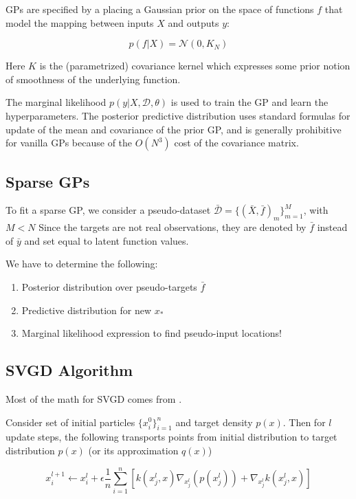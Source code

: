 \documentclass[12pt]{article}
\renewcommand{\[}{\left[}
\renewcommand{\]}{\right]}
\renewcommand{\(}{\left(}
\renewcommand{\)}{\right)}
\begin{document}
GPs are specified by a placing a Gaussian prior on the space of functions $f$ that model the mapping between inputs $X$ and outputs $y$:

$$p(f | X) = \mathcal{N}(0, K_N)$$

Here $K$ is the (parametrized) covariance kernel which expresses some prior notion of smoothness of the underlying function.

The marginal likelihood $p(y | X, \mathcal{D}, \theta)$ is used to train the GP and learn the hyperparameters. The posterior predictive distribution uses standard formulas for update of the mean and covariance of the prior GP, and is generally prohibitive for vanilla GPs because of the $O(N^3)$ cost of the covariance matrix.

\subsection{Sparse GPs}

\citep{snelson_sparse_2005} To fit a sparse GP, we consider a pseudo-dataset $\bar{\mathcal{D}} = \{(\bar{X}, \bar{f})_m\}_{m=1}^{M}$, with $M<N$ Since the targets are not real observations, they are denoted by $\bar{f}$ instead of $\bar{y}$ and set equal to latent function values.

We have to determine the following:

\begin{enumerate}
    \item Posterior distribution over pseudo-targets $\bar{f}$

    \item Predictive distribution for new $x_{\ast}$

    \item Marginal likelihood expression to find pseudo-input locations!
\end{enumerate}

\subsection{SVGD Algorithm}
Most of the math for SVGD comes from \cite{liu_short_2016,liu_kernelized_2016}.

Consider set of initial particles $\{x_i^0\}_{i=1}^n$ and target density $p(x)$. Then for $l$ update steps, the following transports points from initial distribution to target distribution $p(x)$ (or its approximation $q(x)$)

$$x_i^{l+1} \leftarrow x_i^{l} + \epsilon \frac{1}{n}\sum_{i=1}^{n}\left[k(x_j^l, x) \nabla_{x_j^l}(p(x_j^l)) + \nabla_{x_j^l}k(x_j^l, x)\right]$$
\end{document}

